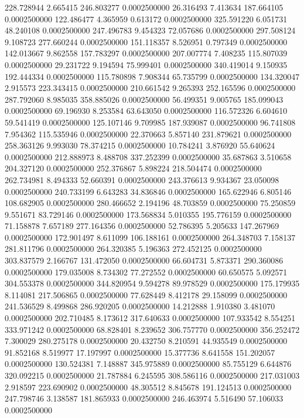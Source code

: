 228.728944 2.665415 246.803277 0.0002500000
26.316493 7.413634 187.664105 0.0002500000
122.486477 4.365959 0.613172 0.0002500000
325.591220 6.051731 48.240108 0.0002500000
247.496783 9.454323 72.057686 0.0002500000
297.508124 9.108723 277.660244 0.0002500000
151.118357 8.526951 0.797349 0.0002500000
142.013667 9.862558 157.783297 0.0002500000
207.007774 7.408235 115.807039 0.0002500000
29.231722 9.194594 75.999401 0.0002500000
340.419014 9.150935 192.444334 0.0002500000
115.780898 7.908344 65.735799 0.0002500000
134.320047 2.915573 223.343415 0.0002500000
210.661542 9.265393 252.165596 0.0002500000
287.792060 8.985035 358.885026 0.0002500000
56.499351 9.005765 185.099043 0.0002500000
69.196930 8.253584 63.643050 0.0002500000
116.572326 6.604610 59.541419 0.0002500000
125.107146 9.709985 187.939087 0.0002500000
96.741808 7.954362 115.535946 0.0002500000
22.370663 5.857140 231.879621 0.0002500000
258.363126 9.993030 78.374215 0.0002500000
10.784241 3.876920 55.640624 0.0002500000
212.888973 8.488708 337.252399 0.0002500000
35.687863 3.510658 204.327120 0.0002500000
252.376867 5.898224 218.504474 0.0002500000
262.734981 8.494333 52.660391 0.0002500000
243.376613 9.934367 23.050098 0.0002500000
240.733199 6.643283 34.836846 0.0002500000
165.622946 6.805146 108.682905 0.0002500000
280.466652 2.194196 48.703859 0.0002500000
75.250859 9.551671 83.729146 0.0002500000
173.568834 5.010355 195.776159 0.0002500000
71.158878 7.657189 277.164356 0.0002500000
52.786395 5.205633 147.267969 0.0002500000
172.901497 8.611099 106.188161 0.0002500000
264.348703 7.158137 281.811796 0.0002500000
264.320385 5.196363 272.452125 0.0002500000
303.837579 2.166767 131.472050 0.0002500000
66.604731 5.873371 290.360086 0.0002500000
179.035008 8.734302 77.272552 0.0002500000
60.650575 5.092571 304.553378 0.0002500000
344.820954 9.594278 89.978529 0.0002500000
175.179935 8.114081 217.506865 0.0002500000
77.628449 8.412178 29.158099 0.0002500000
241.536529 8.499868 286.920205 0.0002500000
14.212888 1.910380 3.481070 0.0002500000
202.710485 8.173612 317.640633 0.0002500000
107.933542 8.554251 333.971242 0.0002500000
68.828401 8.239652 306.757770 0.0002500000
356.252472 7.300029 280.275178 0.0002500000
20.432750 8.210591 44.935549 0.0002500000
91.852168 8.519977 17.197997 0.0002500000
15.377736 8.641558 151.202057 0.0002500000
130.524381 7.148887 345.975889 0.0002500000
85.755129 6.644876 320.092215 0.0002500000
21.787884 6.245595 308.586116 0.0002500000
217.031003 2.918597 223.690902 0.0002500000
48.305512 8.845678 191.124513 0.0002500000
247.798746 3.138587 181.865933 0.0002500000
246.463974 5.516490 57.106033 0.0002500000
